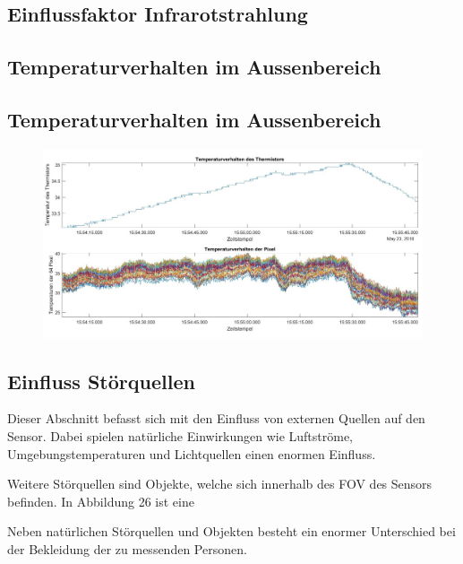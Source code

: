 \subsection{Einflussfaktor Infrarotstrahlung}



\subsection{Temperaturverhalten im Aussenbereich}


\subsection{Temperaturverhalten im Aussenbereich}



\begin{figure}[H]
	\centering
	\includegraphics[width=1.0\textwidth]{fig/Temperaturverhalten2}
	\caption{}
	\label{fig:temperaturverhalten2}
\end{figure}


\subsection{Einfluss Störquellen}

Dieser Abschnitt befasst sich mit den Einfluss von externen Quellen auf den Sensor. Dabei spielen natürliche Einwirkungen wie Luftströme, Umgebungstemperaturen und Lichtquellen einen enormen Einfluss. 



Weitere Störquellen sind Objekte, welche sich innerhalb des \ac{FOV} des Sensors befinden. In Abbildung 26 ist eine



Neben natürlichen Störquellen und Objekten besteht ein enormer Unterschied bei der Bekleidung der zu messenden Personen. 




